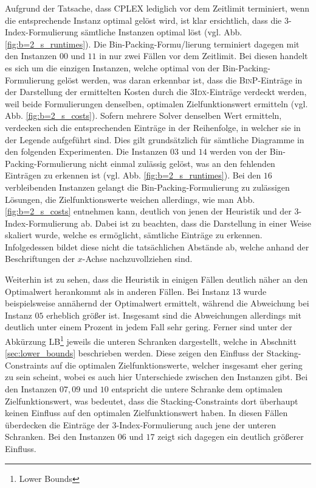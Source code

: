 \vfill
\pagebreak

Aufgrund der Tatsache, dass \textsc{CPLEX} lediglich vor dem Zeitlimit terminiert, wenn die entsprechende Instanz optimal gelöst wird, ist klar ersichtlich, dass die 3-Index-Formulierung sämtliche Instanzen optimal löst (vgl. Abb. \ref{fig:b=2_s_runtimes}). Die Bin-Packing-Formu\-/lierung terminiert dagegen mit den Instanzen $00$ und $11$ in nur zwei Fällen vor dem Zeitlimit. Bei diesen handelt es sich um die einzigen Instanzen, welche optimal von der Bin-Packing-Formulierung gelöst werden, was daran erkennbar ist, dass die \textsc{BinP}-Einträge in der Darstellung der ermittelten Kosten durch die \textsc{3Idx}-Einträge verdeckt werden, weil beide Formulierungen denselben, optimalen Zielfunktionswert ermitteln (vgl. Abb. \ref{fig:b=2_s_costs}).
Sofern mehrere Solver denselben Wert ermitteln, verdecken sich die entsprechenden Einträge in der Reihenfolge, in welcher sie in der Legende aufgeführt sind. Dies gilt grundsätzlich für sämtliche Diagramme in den folgenden Experimenten.
Die Instanzen $03$ und $14$ werden von der Bin-Packing-Formulierung nicht einmal zulässig gelöst, was an den fehlenden
Einträgen zu erkennen ist (vgl. Abb. \ref{fig:b=2_s_runtimes}). Bei den $16$ verbleibenden Instanzen gelangt die Bin-Packing-Formulierung zu zulässigen Lösungen, die Zielfunktionswerte weichen allerdings, wie man Abb. \ref{fig:b=2_s_costs} entnehmen kann, deutlich von jenen der Heuristik und der 3-Index-Formulierung ab. Dabei ist zu beachten, dass die Darstellung in einer Weise skaliert wurde, welche es ermöglicht, sämtliche Einträge zu erkennen. Infolgedessen bildet diese nicht die tatsächlichen Abstände ab, welche anhand der Beschriftungen der $x$-Achse nachzuvollziehen sind.

Weiterhin ist zu sehen, dass die Heuristik in einigen Fällen deutlich näher an den Optimalwert herankommt als in anderen Fällen.
Bei Instanz $13$ wurde beispielsweise annähernd der Optimalwert ermittelt, während die Abweichung bei Instanz
$05$ erheblich größer ist. Insgesamt sind die Abweichungen allerdings mit deutlich unter einem Prozent in jedem
Fall sehr gering. Ferner sind unter der Abkürzung \textsc{LB\footnote{Lower Bounds}} jeweils die unteren Schranken dargestellt, welche in Abschnitt \ref{sec:lower_bounds} beschrieben werden. Diese zeigen den Einfluss der Stacking-Constraints auf die optimalen Zielfunktionswerte, welcher insgesamt eher gering zu sein scheint, wobei es auch hier Unterschiede zwischen den Instanzen gibt. Bei den Instanzen $07, 09$ und $10$ entspricht die untere Schranke dem optimalen Zielfunktionswert, was bedeutet, dass die Stacking-Constraints dort überhaupt keinen Einfluss auf den optimalen Zielfunktionswert haben.
In diesen Fällen überdecken die Einträge der 3-Index-Formulierung auch jene der unteren Schranken. Bei den Instanzen
$06$ und $17$ zeigt sich dagegen ein deutlich größerer Einfluss.

